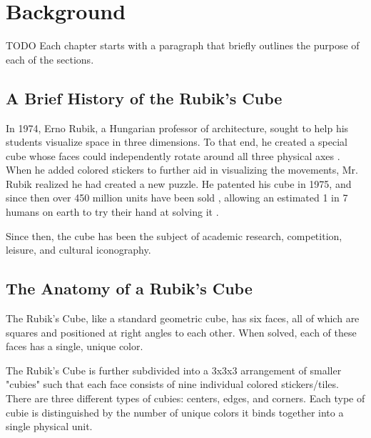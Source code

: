 
\chapter{Background} %

\label{Chapter2} %

TODO Each chapter starts with a paragraph that briefly outlines the
purpose of each of the sections.


\section{A Brief History of the Rubik's Cube}
\label{sec:rubiks-history}

In 1974, Erno Rubik, a Hungarian professor of architecture, sought to
help his students visualize space in three dimensions. To that end, he
created a special cube whose faces could independently rotate around
all three physical axes \cite{rubik-motivation}. When he added colored
stickers to further aid in visualizing the movements, Mr. Rubik
realized he had created a new puzzle. He patented his cube in 1975,
\cite{rubik-patent} and since then over 450 million units have been
sold \cite{forbes-rubik-merger}, allowing an estimated 1 in 7 humans on
earth to try their hand at solving it \cite{rubik-population-reached}.

Since then, the cube has been the subject of academic research,
competition, leisure, and cultural iconography.


\section{The Anatomy of a Rubik's Cube}
\label{sec:rubiks-anatomy}

The Rubik's Cube, like a standard geometric cube, has six faces, all of
which are squares and positioned at right angles to each other. When
solved, each of these faces has a single, unique color.

The Rubik's Cube is further subdivided into a 3x3x3 arrangement of
smaller "cubies" such that each face consists of nine individual
colored stickers/tiles. There are three different types of cubies:
centers, edges, and corners. Each type of cubie is distinguished by the
number of unique colors it binds together into a single physical unit.


